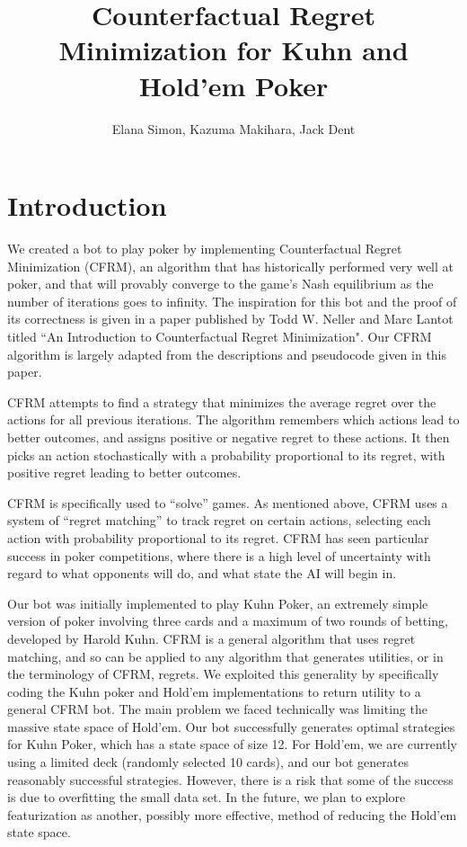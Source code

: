\documentclass[11pt]{article}
\title{Counterfactual Regret Minimization for Kuhn and Hold'em Poker}
\author{Elana Simon, Kazuma Makihara, Jack Dent}
\begin{document}
\maketitle{}


\section{Introduction}

We created a bot to play poker by implementing Counterfactual Regret Minimization (CFRM), an algorithm that has historically performed very well at poker, and that will provably converge to the game’s Nash equilibrium as the number of iterations goes to infinity. The inspiration for this bot and the proof of its correctness is given in a paper published by Todd W. Neller and Marc Lantot titled ``An Introduction to Counterfactual Regret Minimization". Our CFRM algorithm is largely adapted from the descriptions and pseudocode given in this paper.

CFRM attempts to find a strategy that minimizes the average regret over the actions for all previous iterations. The algorithm remembers which actions lead to better outcomes, and assigns positive or negative regret to these actions. It then picks an action stochastically with a probability proportional to its regret, with positive regret leading to better outcomes.

CFRM is specifically used to “solve” games. As mentioned above, CFRM uses a system of “regret matching” to track regret on certain actions, selecting each action with probability proportional to its regret. CFRM has seen particular success in poker competitions, where there is a high level of uncertainty with regard to what opponents will do, and what state the AI will begin in.

Our bot was initially implemented to play Kuhn Poker, an extremely simple version of poker involving three cards and a maximum of two rounds of betting, developed by Harold Kuhn. CFRM is a general algorithm that uses regret matching, and so can be applied to any algorithm that generates utilities, or in the terminology of CFRM, regrets. We exploited this generality by specifically coding the Kuhn poker and Hold'em implementations to return utility to a general CFRM bot. The main problem we faced technically was limiting the massive state space of Hold'em. Our bot successfully generates optimal strategies for Kuhn Poker, which has a state space of size 12. For Hold'em, we are currently using a limited deck (randomly selected 10 cards), and our bot generates reasonably successful strategies. However, there is a risk that some of the success is due to overfitting the small data set. In the future, we plan to explore featurization as another, possibly more effective, method of reducing the Hold'em state space.
\end{document}
